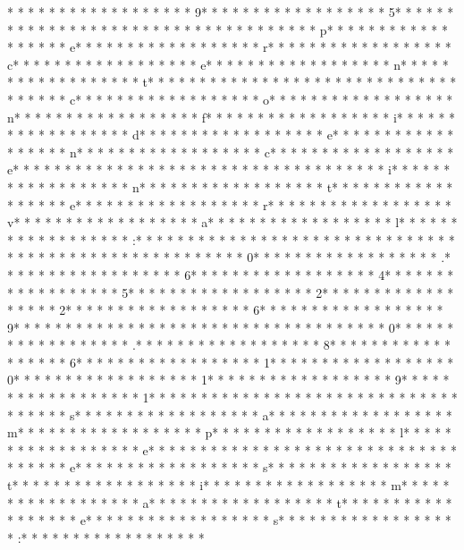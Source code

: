 * * *  * * *  * * *  *  * * *  *  * * *  * 9* * *  * * *  * * *  *  * * *  *  * * *  * 5* * *  * * *  * * *  *  * * *  *  * * *  *  * * *  * * *  * * *  *  * * *  *  * * *  * p* * *  * * *  * * *  *  * * *  *  * * *  * e* * *  * * *  * * *  *  * * *  *  * * *  * r* * *  * * *  * * *  *  * * *  *  * * *  * c* * *  * * *  * * *  *  * * *  *  * * *  * e* * *  * * *  * * *  *  * * *  *  * * *  * n* * *  * * *  * * *  *  * * *  *  * * *  * t* * *  * * *  * * *  *  * * *  *  * * *  *  * * *  * * *  * * *  *  * * *  *  * * *  * c* * *  * * *  * * *  *  * * *  *  * * *  * o* * *  * * *  * * *  *  * * *  *  * * *  * n* * *  * * *  * * *  *  * * *  *  * * *  * f* * *  * * *  * * *  *  * * *  *  * * *  * i* * *  * * *  * * *  *  * * *  *  * * *  * d* * *  * * *  * * *  *  * * *  *  * * *  * e* * *  * * *  * * *  *  * * *  *  * * *  * n* * *  * * *  * * *  *  * * *  *  * * *  * c* * *  * * *  * * *  *  * * *  *  * * *  * e* * *  * * *  * * *  *  * * *  *  * * *  *  * * *  * * *  * * *  *  * * *  *  * * *  * i* * *  * * *  * * *  *  * * *  *  * * *  * n* * *  * * *  * * *  *  * * *  *  * * *  * t* * *  * * *  * * *  *  * * *  *  * * *  * e* * *  * * *  * * *  *  * * *  *  * * *  * r* * *  * * *  * * *  *  * * *  *  * * *  * v* * *  * * *  * * *  *  * * *  *  * * *  * a* * *  * * *  * * *  *  * * *  *  * * *  * l* * *  * * *  * * *  *  * * *  *  * * *  * :* * *  * * *  * * *  *  * * *  *  * * *  * 
* * *  * * *  * * *  *  * * *  *  * * *  *  * * *  * * *  * * *  *  * * *  *  * * *  * 0* * *  * * *  * * *  *  * * *  *  * * *  * .* * *  * * *  * * *  *  * * *  *  * * *  * 6* * *  * * *  * * *  *  * * *  *  * * *  * 4* * *  * * *  * * *  *  * * *  *  * * *  * 5* * *  * * *  * * *  *  * * *  *  * * *  * 2* * *  * * *  * * *  *  * * *  *  * * *  * 2* * *  * * *  * * *  *  * * *  *  * * *  * 6* * *  * * *  * * *  *  * * *  *  * * *  * 9* * *  * * *  * * *  *  * * *  *  * * *  *  * * *  * * *  * * *  *  * * *  *  * * *  * 0* * *  * * *  * * *  *  * * *  *  * * *  * .* * *  * * *  * * *  *  * * *  *  * * *  * 8* * *  * * *  * * *  *  * * *  *  * * *  * 6* * *  * * *  * * *  *  * * *  *  * * *  * 1* * *  * * *  * * *  *  * * *  *  * * *  * 0* * *  * * *  * * *  *  * * *  *  * * *  * 1* * *  * * *  * * *  *  * * *  *  * * *  * 9* * *  * * *  * * *  *  * * *  *  * * *  * 1* * *  * * *  * * *  *  * * *  *  * * *  * 
* * *  * * *  * * *  *  * * *  *  * * *  * s* * *  * * *  * * *  *  * * *  *  * * *  * a* * *  * * *  * * *  *  * * *  *  * * *  * m* * *  * * *  * * *  *  * * *  *  * * *  * p* * *  * * *  * * *  *  * * *  *  * * *  * l* * *  * * *  * * *  *  * * *  *  * * *  * e* * *  * * *  * * *  *  * * *  *  * * *  *  * * *  * * *  * * *  *  * * *  *  * * *  * e* * *  * * *  * * *  *  * * *  *  * * *  * s* * *  * * *  * * *  *  * * *  *  * * *  * t* * *  * * *  * * *  *  * * *  *  * * *  * i* * *  * * *  * * *  *  * * *  *  * * *  * m* * *  * * *  * * *  *  * * *  *  * * *  * a* * *  * * *  * * *  *  * * *  *  * * *  * t* * *  * * *  * * *  *  * * *  *  * * *  * e* * *  * * *  * * *  *  * * *  *  * * *  * s* * *  * * *  * * *  *  * * *  *  * * *  * :* * *  * * *  * * *  *  * * *  *  * * *  * 
